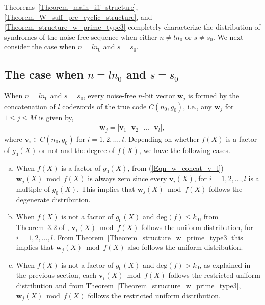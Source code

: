 \documentclass[10pt,journal]{IEEEtran}
\def \deg{{\mathrm{deg}}}
\begin{document}
Theorems~\ref{Theorem_main_iff_structure}, \ref{Theorem_W_suff_pre_cyclic_structure}, and \ref{Theorem_structure_w_prime_type3} 
completely characterize the distribution of syndromes of the noise-free sequence when either $n \neq ln_0$ or $s \neq s_0$.
We next consider the case when $n=ln_0$ and $s=s_0$.

\subsection{The case when $n=ln_0$ and $s=s_0$}
\label{subsection_n_ln0_s_s0}

When $n=ln_0$ and $s=s_0$, every noise-free $n$-bit vector $\mathbf{w}_j$ is formed by the concatenation of $l$
codewords of the true code $C(n_0,g_0)$, i.e., any $\mathbf{w}_j$ for $1 \leq j \leq M$ is given by,
% 
\begin{align}
%  
\mathbf{w}_j = \big[ \mathbf{v}_1 \mbox{~~} \mathbf{v}_2 \mbox{~~} \ldots \mbox{~~} \mathbf{v}_l \big],
\label{Eqn_w_concat_v_l}
% 
\end{align}
% 
where $\mathbf{v}_i \in C(n_0,g_0)$ for $i = 1,2,\ldots,l$.
Depending on whether $f(X)$ is a factor of $g_0(X)$ or not and the degree of $f(X)$, we have the following cases.
% 
\begin{enumerate}[(a)]
% 
\item When $f(X)$ is a factor of $g_0(X)$, from (\ref{Eqn_w_concat_v_l}) $\mathbf{w}_j(X) \bmod f(X)$ is always zero since 
every $\mathbf{v}_i(X)$, for $i = 1,2,\ldots,l$ is a multiple of $g_0(X)$. This implies that $\mathbf{w}_j(X) \bmod f(X)$ follows the degenerate 
distribution.
% 
\item When $f(X)$ is not a factor of $g_0(X)$ and $\deg(f) \leq k_0$, from Theorem~3.2 of \cite{EuropeanWireless2014},
$\mathbf{v}_i(X) \bmod f(X)$ follows the uniform distribution, for $i = 1,2,\ldots,l$. 
From Theorem~\ref{Theorem_structure_w_prime_type3} this implies that $\mathbf{w}_j(X) \bmod f(X)$
also follows the uniform distribution. 
% 
\item When $f(X)$ is not a factor of $g_0(X)$ and $\deg(f) > k_0$, as explained in the previous section, each 
$\mathbf{v}_i(X) \bmod f(X)$ follows the restricted uniform distribution and
from Theorem~\ref{Theorem_structure_w_prime_type3}, $\mathbf{w}_j(X) \bmod f(X)$ follows the restricted uniform distribution. 
%  
\end{enumerate}
% 
\end{document}
